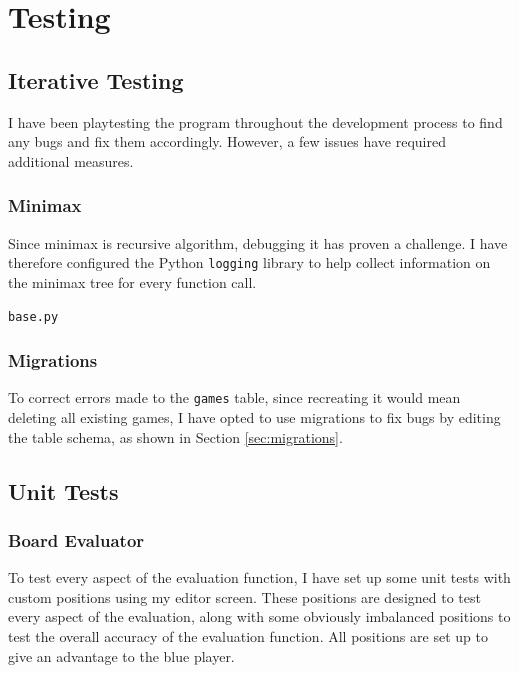 \documentclass[../main/main.tex]{subfiles}
\begin{document}
\newpage
\chapter{Testing}

\section{Iterative Testing}
I have been playtesting the program throughout the development process to find any bugs and fix them accordingly. However, a few issues have required additional measures.

\subsection{Minimax}
Since minimax is recursive algorithm, debugging it has proven a challenge. I have therefore configured the Python \lstinline{logging} library to help collect information on the minimax tree for every function call.

\noindent\verb|base.py|


\subsection{Migrations}
To correct errors made to the \lstinline{games} table, since recreating it would mean deleting all existing games, I have opted to use migrations to fix bugs by editing the table schema, as shown in Section \ref{sec:migrations}.

\section{Unit Tests}
\subsection{Board Evaluator}
To test every aspect of the evaluation function, I have set up some unit tests with custom positions using my editor screen. These positions are designed to test every aspect of the evaluation, along with some obviously imbalanced positions to test the overall accuracy of the evaluation function. All positions are set up to give an advantage to the blue player.
\end{document}
